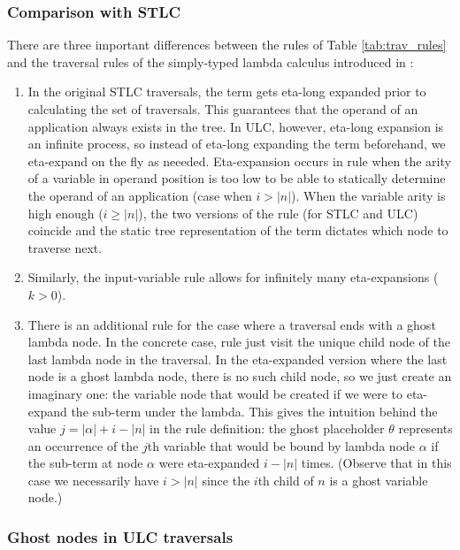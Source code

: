 \documentclass{article}
\theoremstyle{definition}
\newcommand{\ghostlmd}{{\lambda\!\!\lambda}}
\newcommand{\ghostvar}{\theta}
\begin{document}
\subsubsection{Comparison with STLC}
There are three important differences between the rules of Table \ref{tab:trav_rules} and the traversal rules of the simply-typed lambda calculus introduced in \cite{Blum2006}:
\begin{enumerate}
  \item In the original STLC traversals, the term gets eta-long expanded prior to calculating the set of traversals. This guarantees that the operand of an application always exists in the tree. In ULC, however, eta-long expansion is an infinite process, so instead of eta-long expanding the term beforehand, we eta-expand on the fly as neeeded. Eta-expansion occurs in rule  when the arity of a variable in operand position is too low to be able to statically determine the operand of an application (case when $i>|n|$). When the variable arity is high enough ($i\geq|n|$), the two versions of the rule (for STLC and ULC) coincide and the static tree representation of the term dictates which node to traverse next.

  \item Similarly, the input-variable rule allows for infinitely many eta-expansions ($k>0$).

  \item There is an additional rule \rulenamet{Lam^\ghostlmd} for the case where a traversal ends with a ghost lambda node. In the concrete case, rule  just visit the unique child node of the last lambda node in the traversal. In the eta-expanded version where the last node is a ghost lambda node, there is no such child node, so we just create an imaginary one: the variable node that would be created if we were to eta-expand the sub-term under the lambda.
      This gives the intuition behind the value $j = |\alpha| + i - |n|$ in the rule definition: the ghost placeholder $\ghostvar$ represents an occurrence of the $j$th variable that would be bound by lambda node $\alpha$ if the sub-term at node $\alpha$ were eta-expanded $i-|n|$ times.
  (Observe that in this case we necessarily have $i>|n|$ since the $i$th child of $n$ is a ghost variable node.)

\end{enumerate}

\subsubsection{Ghost nodes in ULC traversals}
\end{document}
